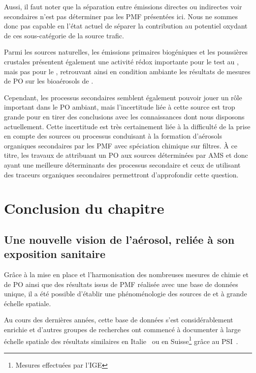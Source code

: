 Aussi, il faut noter que la séparation entre émissions directes ou indirectes voir
secondaires n'est pas déterminer pas les PMF présentées ici. Nous ne sommes donc pas
capable en l'état actuel de séparer la contribution au potentiel oxydant de ces
sous-catégorie de la source trafic.

Parmi les sources naturelles, les émissions primaires biogéniques et les poussières
crustales présentent également une activité rédox importante pour le test au \PODTT, mais
pas pour le \POAA, retrouvant ainsi en condition ambiante les résultats de mesures de PO
sur les bioaérosols de \cite{samakeUnexpected2017}.

Cependant, les processus secondaires semblent également pouvoir jouer un rôle important
dans le PO ambiant, mais l'incertitude liée à cette source est trop grande pour en tirer
des conclusions avec les connaissances dont nous disposons actuellement. Cette
incertitude est très certainement liée à la difficulté de la prise en compte des sources
ou processus conduisant à la formation d'aérosols organiques secondaires par les PMF avec
spéciation chimique sur filtres.
À ce titre, les travaux de \cite{daellenbachSourcessubmitted} attribuant un PO aux sources
déterminées par AMS et donc ayant une meilleure déterminants des processus secondaire et
ceux de \cite{borlazaUrbaninprep.} utilisant des traceurs organiques secondaires
permettront d'approfondir cette question.

\section{Conclusion du chapitre}%
\label{sec:conclusion_chap4}

\subsection{Une nouvelle vision de l'aérosol, reliée à son exposition sanitaire}%
\label{sub:une_nouvelle_vision_de_l_aérosol_plus_proche_de_l_impact_sanitaire}

Grâce à la mise en place et l'harmonisation des nombreuses mesures de chimie et de PO
ainsi que des résultats issus de PMF réalisée avec une base de données unique, il a été possible
d'établir une phénoménologie des sources de \POAA{} et \PODTT{} à grande échelle spatiale.

Au cours des dernières années, cette base de données s'est considérablement enrichie et
d'autres groupes de recherches ont commencé à documenter à large échelle spatiale des
résultats similaires en Italie~\autocite{pietrograndeReview2019} ou en
Suisse\footnote{Mesures effectuées par l'IGE} grâce au
PSI~\autocite{daellenbachSourcessubmitted}. 

